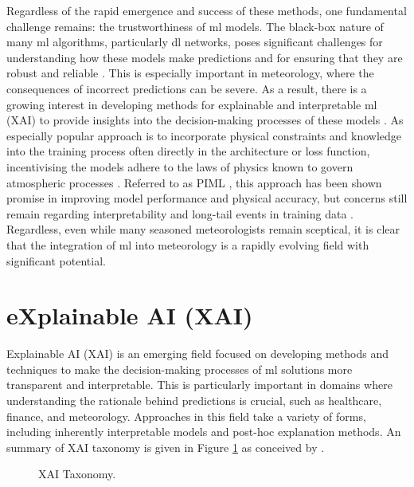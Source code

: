 Regardless of the rapid emergence and success of these methods, one fundamental challenge remains: the trustworthiness of \acrshort{ml} models. The black-box nature of many \acrshort{ml} algorithms, particularly \acrshort{dl} networks, poses significant challenges for understanding how these models make predictions and for ensuring that they are robust and reliable . This is especially important in meteorology, where the consequences of incorrect predictions can be severe. As a result, there is a growing interest in developing methods for explainable and interpretable \acrshort{ml} (XAI)  to provide insights into the decision-making processes of these models . As especially popular approach is to incorporate physical constraints and knowledge into the training process often directly in the architecture or loss function, incentivising the models adhere to the laws of physics known to govern atmospheric processes \citep{Dabrowski2020,Chen2022,Luo2025,Zhang2023}. Referred to as PIML , this approach has been shown promise in improving model performance and physical accuracy, but concerns still remain regarding interpretability and long-tail events in training data \citep{Sun2025}. Regardless, even while many seasoned meteorologists remain sceptical, it is clear that the integration of \acrshort{ml} into meteorology is a rapidly evolving field with significant potential.

\section{eXplainable AI (XAI)}

Explainable AI (XAI)  is an emerging field focused on developing methods and techniques to make the decision-making processes of \acrshort{ml} solutions more transparent and interpretable. This is particularly important in domains where understanding the rationale behind predictions is crucial, such as healthcare, finance, and meteorology. Approaches in this field take a variety of forms, including inherently interpretable models and post-hoc explanation methods. An summary of XAI taxonomy is given in Figure \ref{fig:xai-taxonomy} as conceived by .

\begin{figure}[h]
    \centering
    \caption{XAI Taxonomy.}
    \label{fig:xai-taxonomy}
\end{figure}

